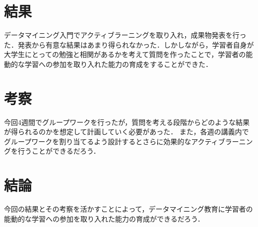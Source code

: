 \documentclass[uplatex,twocolumn,dvipdfmx]{jsarticle}
\begin{document}
\section{結果}

データマイニング入門でアクティブラーニングを取り入れ，成果物発表を行った．発表から有意な結果はあまり得られなかった．しかしながら，学習者自身が大学生にとっての勉強と相関があるかを考えて質問を作ったことで，学習者の能動的な学習への参加を取り入れた能力の育成をすることができた．


\section{考察}

今回4週間でグループワークを行ったが，質問を考える段階からどのような結果が得られるのかを想定して計画していく必要があった．
また，各週の講義内でグループワークを割り当てるよう設計するとさらに効果的なアクティブラーニングを行うことができるだろう．





\section{結論}

今回の結果とその考察を活かすことによって，データマイニング教育に学習者の能動的な学習への参加を取り入れた能力の育成ができるだろう．



\end{document}
